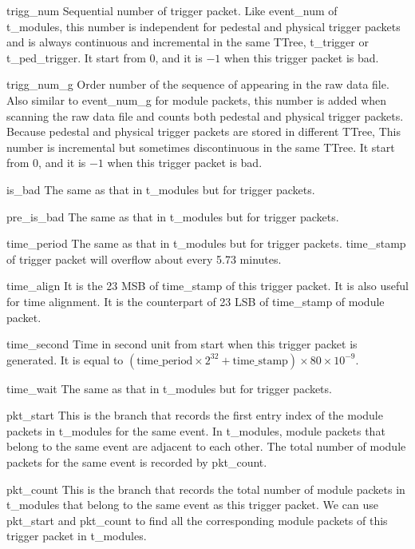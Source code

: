 \documentclass[a4paper, 12pt, onecolumn]{article}
\begin{document}
\begin{asparadesc}
\item[trigg\_num] Sequential number of trigger packet.
  Like event\_num of \\ t\_modules, this number is independent for pedestal and physical trigger packets
  and is always continuous and incremental in the same TTree, t\_trigger or t\_ped\_trigger.
  It start from 0, and it is $-1$ when this trigger packet is bad.
\item[trigg\_num\_g] Order number of the sequence of appearing in the raw data file.
  Also similar to event\_num\_g for module packets, this number is added when scanning the raw data file and counts both pedestal and physical trigger packets.
  Because pedestal and physical trigger packets are stored in different TTree, This number is incremental but sometimes discontinuous in the same TTree.
  It start from 0, and it is $-1$ when this trigger packet is bad.
\item[is\_bad] The same as that in t\_modules but for trigger packets.
\item[pre\_is\_bad] The same as that in t\_modules but for trigger packets.
\item[time\_period] The same as that in t\_modules but for trigger packets. time\_stamp of trigger packet will overflow about every 5.73 minutes.
\item[time\_align] It is the 23 MSB of time\_stamp of this trigger packet. It is also useful for time alignment.
  It is the counterpart of 23 LSB of time\_stamp of module packet.
\item[time\_second] Time in second unit from start when this trigger packet is generated.
  It is equal to $(\textrm{time\_period} \times 2^{32} + \textrm{time\_stamp}) \times 80 \times 10^{-9}$.
\item[time\_wait] The same as that in t\_modules but for trigger packets.
\item[pkt\_start] This is the branch that records the first entry index of the module packets in t\_modules for the same event.
  In t\_modules, module packets that belong to the same event are adjacent to each other. The total number of module packets for the same event is recorded by pkt\_count.
\item[pkt\_count] This is the branch that records the total number of module packets in t\_modules that belong to the same event as this trigger packet.
  We can use pkt\_start and pkt\_count to find all the corresponding module packets of this trigger packet in t\_modules.

\end{asparadesc}
\end{document}
